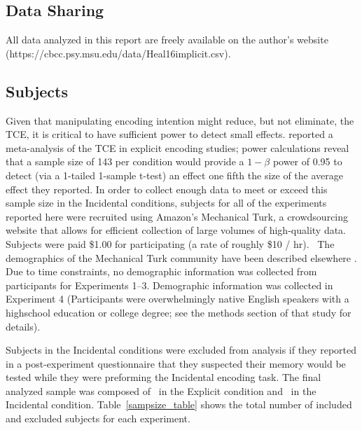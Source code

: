 \documentclass[man,natbib,floatsintext]{apa6} %
\begin{document}
\subsection{Data Sharing}All data analyzed in this report are freely available on the author's website (https://cbcc.psy.msu.edu/data/Heal16implicit.csv).

\subsection{Subjects}

Given that manipulating encoding intention might reduce, but not eliminate, the TCE, it is critical to have sufficient power to detect small effects. \citet{SedeEtal10} reported a meta-analysis of the TCE in explicit encoding studies; power calculations reveal that a sample size of 143 per condition would provide a $1-\beta$ power of 0.95 to detect (via a 1-tailed 1-sample t-test) an effect one fifth the size of the average effect they reported. 
In order to collect enough data to meet or exceed this sample size in the Incidental conditions, subjects for all of the experiments reported here were recruited using Amazon's Mechanical Turk, a crowdsourcing website that allows for efficient collection of large volumes of high-quality data. Subjects were paid \$1.00 for participating (a rate of roughly \$10 / hr).~\label{TODO-10} \color{red}The demographics of the Mechanical Turk community have been described elsewhere \cite[approximately 55\% female with a mean age of 32;][]{MasoSuri12}. Due to time constraints, no demographic information was collected from participants for Experiments 1--3. Demographic information was collected in Experiment 4 (Participants were overwhelmingly native English speakers with a highschool education or college degree; see the methods section of that study for details). \color{black}

Subjects in the Incidental conditions were excluded from analysis if they reported in a post-experiment questionnaire that they suspected their memory would be tested while they were preforming the Incidental encoding task. The final analyzed sample was composed of \shoeExplicitIncluded~in the Explicit condition and \shoeIncidentalIncluded~in the Incidental condition. Table~\ref{sampsize_table} shows the total number of included and excluded subjects for each experiment.
\end{document}
